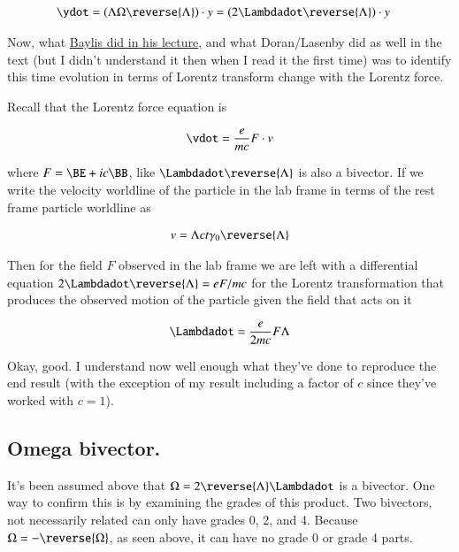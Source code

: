 \begin{align*}
\ydot 
&= \left( \Lambda \Omega \reverse{\Lambda} \right) \cdot y = \left( 2 \Lambdadot \reverse{\Lambda} \right) \cdot y 
\end{align*}

Now, what 
\href{http://www.ime.unicamp.br/%7Eicca8/videos/baylis.avi}{Baylis did in his lecture}, and what Doran/Lasenby did as
well in the text (but I didn't understand it then when I read it the first time) was to identify this time evolution
in terms of Lorentz transform change with the Lorentz force.

Recall that the Lorentz force equation is

\begin{align}\label{eqn:eRotor:LorentzForce}
\vdot = \frac{e}{m c} F \cdot v
\end{align}

where $F = \BE + i c \BB$, like $\Lambdadot\reverse{\Lambda}$ is also a bivector.  If we write the velocity worldline
of the particle in the lab frame in terms of the rest frame particle worldline as

\begin{align*}
v = \Lambda c t \gamma_0 \reverse{\Lambda}
\end{align*}

Then for the field $F$ observed in the lab frame we are left with a differential equation 
$2 \Lambdadot \reverse{\Lambda} = e F / mc$
for the Lorentz transformation
that produces the observed motion of the particle given the field that acts on it

\begin{align}\label{eqn:eRotor:LorentzTxEvolution}
\Lambdadot = \frac{e}{2 m c} F \Lambda
\end{align}

Okay, good.  I understand now well enough what they've done to reproduce the end result (with the exception of my 
result including a factor of $c$ since they've worked with $c=1$).

\subsection{Omega bivector. }

It's been assumed above that $\Omega = 2 \reverse{\Lambda} \Lambdadot$ is a bivector.  One way to confirm this is by examining the grades of this product.  Two bivectors, not necessarily related can only have grades 0, 2, and 4.  Because $\Omega = -\reverse{\Omega}$, as seen above, it can have no grade 0 or grade 4 parts.


